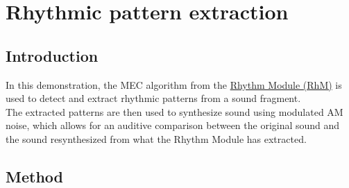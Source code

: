 \newpage
\section{Rhythmic pattern extraction}

\hypertarget{Concepts:IPEMDemoStartMEC}{}
\hypertarget{Concepts:IPEMDemoMECRhythmExtraction}{}

\subsection{Introduction}

In this demonstration, the MEC algorithm from the
\hyperlink{Concepts:RhythmModule}{Rhythm Module (RhM)} is used to
detect and extract rhythmic patterns from a sound fragment.\\
The extracted patterns are then used to synthesize sound using
modulated AM noise, which allows for an auditive comparison
between the original sound and the sound resynthesized from what
the Rhythm Module has extracted.

\subsection{Method}

